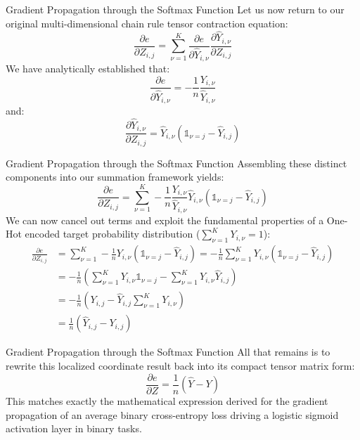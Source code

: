 \begin{frame}{Gradient Propagation through the Softmax Function}
	Let us now return to our original multi-dimensional chain rule tensor contraction equation:
	\begin{equation*}
		\frac{\partial{e}}{\partial{Z_{i,j}}} = \sum_{\nu=1}^K \frac{\partial{e}}{\partial{\hat{Y}_{i,\nu}}} 	\frac{\partial{\hat{Y}_{i,\nu}}}{\partial{Z_{i,j}}}
	\end{equation*}
	\pause
	We have analytically established that:
	\begin{equation*}
		\frac{\partial{e}}{\partial{\hat{Y}_{i,\nu}}} = - \frac{1}{n} \frac{Y_{i,\nu}}{\hat{Y}_{i,\nu}}
	\end{equation*}	
	\pause
	and:
	\begin{equation*}
		\frac{\partial{\hat{Y}_{i,\nu}}}{\partial{Z_{i,j}}} = \hat{Y}_{i,\nu} \left(\mathbb{1}_{\nu=j} - \hat{Y}_{i,j}\right)
	\end{equation*}
\end{frame}

\begin{frame}{Gradient Propagation through the Softmax Function}
	Assembling these distinct components into our summation framework yields:
	\begin{equation*}
		\frac{\partial{e}}{\partial{Z_{i,j}}} = \sum_{\nu=1}^K - \frac{1}{n} \frac{Y_{i,\nu}}{\hat{Y}_{i,\nu}} \hat{Y}_{i,\nu} \left(\mathbb{1}_{\nu=j} - \hat{Y}_{i,j}\right)
	\end{equation*}
	\pause
	We can now cancel out terms and exploit the fundamental properties of a One-Hot encoded target probability distribution ($\sum_{\nu=1}^K Y_{i,\nu} = 1$):
	\begin{equation*}
		\begin{aligned}
			\frac{\partial{e}}{\partial{Z_{i,j}}} 
			&= \sum_{\nu=1}^K - \frac{1}{n} Y_{i,\nu} \left(\mathbb{1}_{\nu=j} - \hat{Y}_{i,j}\right)
			= - \frac{1}{n} \sum_{\nu=1}^K Y_{i,\nu} \left(\mathbb{1}_{\nu=j} - \hat{Y}_{i,j}\right) \\
			&= - \frac{1}{n} \left(\sum_{\nu=1}^K Y_{i,\nu} \mathbb{1}_{\nu=j} - \sum_{\nu=1}^K Y_{i,\nu} \hat{Y}_{i,j} \right) \\
			&= - \frac{1}{n} \left(Y_{i,j} - \hat{Y}_{i,j} \sum_{\nu=1}^K Y_{i,\nu} \right) \\
			&= \frac{1}{n} \left(\hat{Y}_{i,j} - Y_{i,j} \right)
		\end{aligned}
	\end{equation*}	
\end{frame}

\begin{frame}{Gradient Propagation through the Softmax Function}
	All that remains is to rewrite this localized coordinate result back into its compact tensor matrix form:
	\begin{equation*}
		\frac{\partial{e}}{\partial{Z}} = \frac{1}{n} \left(\hat{Y} - Y \right)
	\end{equation*}
	This matches exactly the mathematical expression derived for the gradient propagation of an average binary cross-entropy loss driving a logistic sigmoid activation layer in binary tasks.
\end{frame}